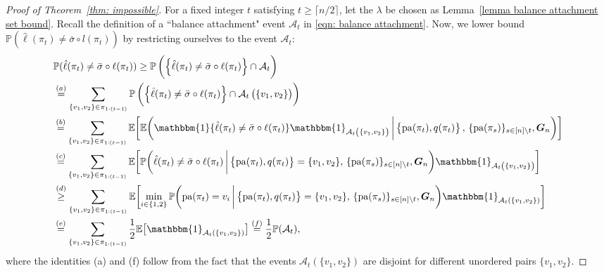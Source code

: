 \documentclass[twoside,11pt]{article}
\theoremstyle{remark}
\begin{document}
\begin{proof}[Proof of Theorem~\ref{thm: impossible}]
For a fixed integer $t$ satisfying $t \ge \lceil n/2\rceil$,
let the $\lambda$ be chosen as Lemma~\ref{lemma balance attachment set bound}. 
Recall the definition of a ``balance attachment" event $\mathcal{A}_t$ in \eqref{eqn: balance attachment}. Now, we lower bound $\mathbb{P}\left(\hat{\ell}\left(\pi_{t}\right)\neq 
\bar{\sigma}\circ l\left(\pi_{t}\right)\right)$ by restricting ourselves to the event $\mathcal{A}_t$:
%
\begingroup
\begin{equation}
\label{thm: impossible eqn2}
\begin{aligned}
&\mathbb{P}(\hat{\ell}(\pi_t) \neq \bar{\sigma} \circ\ell(\pi_t)) \geq  \mathbb{P}\left(\left\{\hat{\ell}(\pi_t) \neq \bar{\sigma} \circ \ell(\pi_t) \right\}\cap \mathcal{A}_t\right) \\
& \stackrel{(a)}{=} 
\sum_{\{v_1, v_2\} \in \pi_{1:(t-1)}} \mathbb{P}\left(\left\{\hat{\ell}(\pi_t) \neq \bar{\sigma} \circ \ell(\pi_t) \right\}\cap \mathcal{A}_t\left(\{v_1, v_2\}\right)\right) \\
%
&\stackrel{(b)}{=} \sum_{\{v_1, v_2\} \in \pi_{1:(t-1)}} \mathbb{E}\biggl[ \mathbb{E}\biggl(  \mathbbm{1}\{\hat{\ell}(\pi_t) \neq \bar{\sigma} \circ\ell(\pi_t) \} \mathbbm{1}_{\mathcal{A}_t\left( \{v_1, v_2\}\right)} \,\bigg|  \left\{\operatorname{pa}(\pi_t), q(\pi_t)\right\},\, \{\text{pa}(\pi_s)\}_{s \in [n]\backslash{t}}, \bm{G}_n \biggr)  \biggr]\\
%
& \stackrel{(c)}{=} \sum_{\{v_1, v_2\} \in \pi_{1:(t-1)}} \mathbb{E}\biggl[ \mathbb{P}\biggl(  \hat{\ell}(\pi_t) \neq \bar{\sigma} \circ\ell(\pi_t) \,\bigg|  \left\{\operatorname{pa}(\pi_t), q(\pi_t)\right\}=\{v_1, v_2\},\, \{\text{pa}(\pi_s)\}_{s \in [n]\backslash{t}}, \bm{G}_n \biggr) \mathbbm{1}_{\mathcal{A}_t\left( \{v_1, v_2\}\right)} \biggr] \\
%
& \stackrel{(d)}{\geq } \sum_{\{v_1, v_2\} \in \pi_{1:(t-1)}} \mathbb{E}\biggl[ \min_{i \in \{1, 2\}} \mathbb{P}\biggl(\text{pa}(\pi_t) = v_i \,\bigg| \left\{\operatorname{pa}(\pi_t), q(\pi_t)\right\}=\{v_1, v_2\},\, \{\text{pa}(\pi_s)\}_{s \in [n]\backslash{t}}, \bm{G}_n \biggr) \mathbbm{1}_{\mathcal{A}_t(\{v_1, v_2\})} \biggr] \\
%
& \stackrel{(e)}{=} \sum_{\{v_1, v_2\} \in \pi_{1:(t-1)}} \frac{1}{2} \mathbb{E}\bigl[\mathbbm{1}_{\mathcal{A}_t(\{v_1, v_2\})} \bigr]  \stackrel{(f)}{=} \frac{1}{2} \mathbb{P}( \mathcal{A}_t),
\end{aligned}
\end{equation}
\endgroup
%
where the identities (a) and (f) follow from the fact that the events $\mathcal{A}_t(\{v_1, v_2\})$ are disjoint for different unordered pairs $\{v_1, v_2\}$. 

\end{proof}
\end{document}
